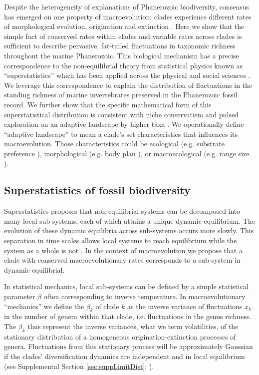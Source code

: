 \documentclass[12pt]{article}
\let\citep=\cite
\begin{document}
Despite the heterogeneity of explanations of Phanerozoic biodiversity,
consensus has emerged on one property of macroevolution: clades
experience different rates of morphological evolution, origination and
extinction \citep{simpson1953, sepkoski1984, gilinsky1994,
  rabosky2014}. Here we show that the simple fact of conserved rates
within clades and variable rates across clades is sufficient to
describe pervasive, fat-tailed fluctuations in taxonomic richness
throughout the marine Phanerozoic.  This biological mechanism has a
precise correspondence to the non-equilibrial theory from statistical
physics known as ``superstatistics'' \citep{beck2003} which has been
applied across the physical and social sciences \citep{beck2004,
  fuentes2009}. We leverage this correspondence to explain the
distribution of fluctuations in the standing richness of marine
invertebrates preserved in the Phanerozoic fossil record. We further
show that the specific mathematical form of this superstatistical
distribution is consistent with niche conservatism
\citep{roy2009range, hopkins2014} and pulsed exploration on an
adaptive landscape by higher taxa \citep{simpson1953,
  eldredgeGould1972, newman1985adaptive, hopkins2014}. We
operationally define ``adaptive landscape'' to mean a clade's set
characteristics that influences its macroevolution. Those
characteristics could be ecological (e.g.  substrate preference
\citep{bambach1983, bush2007, hopkins2014}), morphological (e.g. body
plan \citep{erwin2012}), or macroecological (e.g. range size
\citep{harnik2011, foote2008paleobiol}).


\subsection{Superstatistics of fossil biodiversity}

Superstatistics \citep{beck2003} proposes that non-equilibrial systems
can be decomposed into many local sub-systems, each of which attains a
unique dynamic equilibrium. The evolution of these dynamic equilibria
across sub-systems occurs more slowly. This separation in time scales
allows local systems to reach equilibrium while the system as a whole
is not \citep{beck2003}.  In the context of macroevolution we propose
that a clade with conserved macroevolutionary rates corresponds to a
sub-system in dynamic equilibrial.

In statistical mechanics, local sub-systems can be defined by a simple
statistical parameter $\beta$ often corresponding to inverse
temperature. In macroevolutionary ``mechanics'' we define the
$\beta_k$ of clade $k$ as the inverse variance of fluctuations $x_k$
in the number of genera within that clade, i.e. fluctuations in the
genus richness.  The $\beta_k$ thus represent the inverse variances,
what we term volatilities, of the stationary distribution of a
homogeneous origination-extinction processes of genera. Fluctuations
from this stationary process will be approximately Gaussian if the
clades' diversification dynamics are independent and in local
equilibrium (see Supplemental Section \ref{sec:suppLimitDist};
\citep{grassmann1987}).
\end{document}
